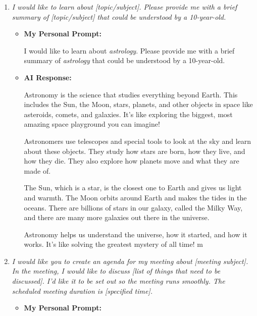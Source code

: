 \documentclass[12pt]{article}
\begin{document}
\begin{enumerate}
    
    \item \emph{I would like to learn about [topic/subject]. Please provide me with a brief summary of [topic/subject] that could be understood by a 10-year-old.}
    
    \begin{itemize}
        
        \item \textbf{My Personal Prompt:}

        I would like to learn about \emph{astrology}. Please provide me with a brief summary of \emph{astrology} that could be understood by a 10-year-old.
        
        \item \textbf{AI Response:}
        
        Astronomy is the science that studies everything beyond Earth. This includes the Sun, the Moon, stars, planets, and other objects in space like asteroids, comets, and galaxies. It's like exploring the biggest, most amazing space playground you can imagine!

        Astronomers use telescopes and special tools to look at the sky and learn about these objects. They study how stars are born, how they live, and how they die. They also explore how planets move and what they are made of.

        The Sun, which is a star, is the closest one to Earth and gives us light and warmth. The Moon orbits around Earth and makes the tides in the oceans. There are billions of stars in our galaxy, called the Milky Way, and there are many more galaxies out there in the universe.

        Astronomy helps us understand the universe, how it started, and how it works. It’s like solving the greatest mystery of all time!
        m
    \end{itemize}

    \item \emph{I would like you to create an agenda for my meeting about [meeting subject]. In the meeting, I would like to discuss [list of things that need to be discussed]. I’d like it to be set out so the meeting runs smoothly. The scheduled meeting duration is [specified time].}

    \begin{itemize}
        
        \item \textbf{My Personal Prompt:}


\end{itemize}
\end{enumerate}
\end{document}
